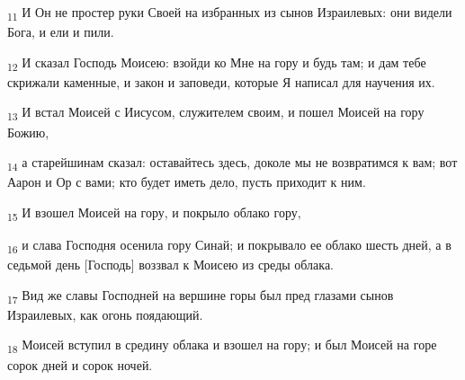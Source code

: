 \begin{tcolorbox}
\textsubscript{11} И Он не простер руки Своей на избранных из сынов Израилевых: они видели Бога, и ели и пили.
\end{tcolorbox}
\begin{tcolorbox}
\textsubscript{12} И сказал Господь Моисею: взойди ко Мне на гору и будь там; и дам тебе скрижали каменные, и закон и заповеди, которые Я написал для научения их.
\end{tcolorbox}
\begin{tcolorbox}
\textsubscript{13} И встал Моисей с Иисусом, служителем своим, и пошел Моисей на гору Божию,
\end{tcolorbox}
\begin{tcolorbox}
\textsubscript{14} а старейшинам сказал: оставайтесь здесь, доколе мы не возвратимся к вам; вот Аарон и Ор с вами; кто будет иметь дело, пусть приходит к ним.
\end{tcolorbox}
\begin{tcolorbox}
\textsubscript{15} И взошел Моисей на гору, и покрыло облако гору,
\end{tcolorbox}
\begin{tcolorbox}
\textsubscript{16} и слава Господня осенила гору Синай; и покрывало ее облако шесть дней, а в седьмой день [Господь] воззвал к Моисею из среды облака.
\end{tcolorbox}
\begin{tcolorbox}
\textsubscript{17} Вид же славы Господней на вершине горы был пред глазами сынов Израилевых, как огонь поядающий.
\end{tcolorbox}
\begin{tcolorbox}
\textsubscript{18} Моисей вступил в средину облака и взошел на гору; и был Моисей на горе сорок дней и сорок ночей.
\end{tcolorbox}
